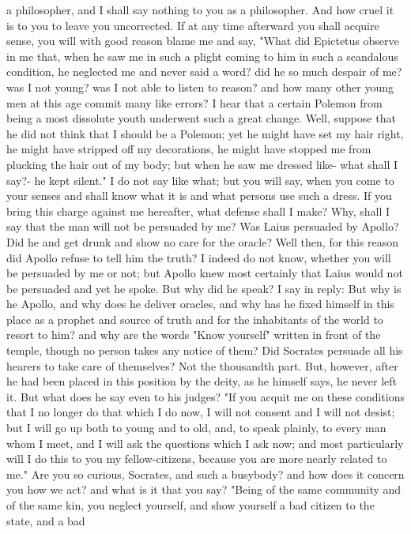 \documentclass[a4paper]{article}
\begin{document}
a philosopher, and I shall say nothing to you as a philosopher. And how cruel
it is to you to leave you uncorrected. If at any time afterward you shall
acquire sense, you will with good reason blame me and say, "What did Epictetus
observe in me that, when he saw me in such a plight coming to him in such a
scandalous condition, he neglected me and never said a word? did he so much
despair of me? was I not young? was I not able to listen to reason? and how
many other young men at this age commit many like errors? I hear that a certain
Polemon from being a most dissolute youth underwent such a great change. Well,
suppose that he did not think that I should be a Polemon; yet he might have set
my hair right, he might have stripped off my decorations, he might have stopped
me from plucking the hair out of my body; but when he saw me dressed like- what
shall I say?- he kept silent." I do not say like what; but you will say, when
you come to your senses and shall know what it is and what persons use such a
dress.
    If you bring this charge against me hereafter, what defense shall I make?
Why, shall I say that the man will not be persuaded by me? Was Laius persuaded
by Apollo? Did he and get drunk and show no care for the oracle? Well then, for
this reason did Apollo refuse to tell him the truth? I indeed do not know,
whether you will be persuaded by me or not; but Apollo knew most certainly that
Laius would not be persuaded and yet he spoke. But why did he speak? I say in
reply: But why is he Apollo, and why does he deliver oracles, and why has he
fixed himself in this place as a prophet and source of truth and for the
inhabitants of the world to resort to him? and why are the words "Know
yourself" written in front of the temple, though no person takes any notice of
them?
    Did Socrates persuade all his hearers to take care of themselves? Not the
thousandth part. But, however, after he had been placed in this position by the
deity, as he himself says, he never left it. But what does he say even to his
judges? "If you acquit me on these conditions that I no longer do that which I
do now, I will not consent and I will not desist; but I will go up both to
young and to old, and, to speak plainly, to every man whom I meet, and I will
ask the questions which I ask now; and most particularly will I do this to you
my fellow-citizens, because you are more nearly related to me." Are you so
curious, Socrates, and such a busybody? and how does it concern you how we act?
and what is it that you say? "Being of the same community and of the same kin,
you neglect yourself, and show yourself a bad citizen to the state, and a bad
\end{document}

